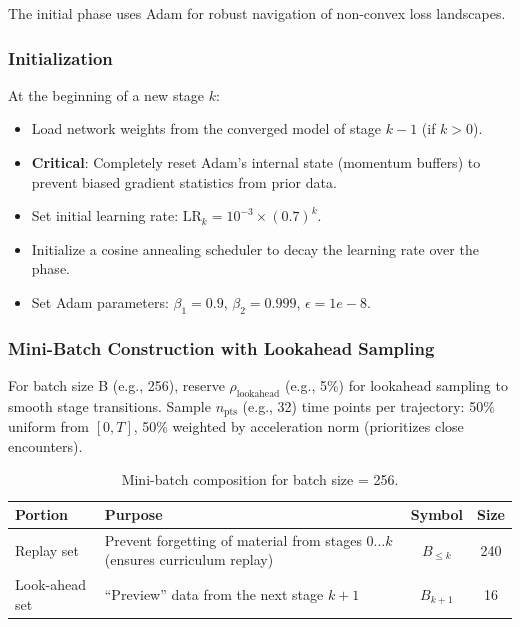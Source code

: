 The initial phase uses Adam for robust navigation of non-convex loss landscapes.

\subsubsection{Initialization}
At the beginning of a new stage $k$:
\begin{itemize}
    \item Load network weights from the converged model of stage $k-1$ (if $k > 0$).
    \item \textbf{Critical}: Completely reset Adam's internal state (momentum buffers) to prevent biased gradient statistics from prior data.
    \item Set initial learning rate: $\text{LR}_k = 10^{-3} \times (0.7)^k$.
    \item Initialize a cosine annealing scheduler to decay the learning rate over the phase.
    \item Set Adam parameters: $\beta_1 = 0.9$, $\beta_2 = 0.999$, $\epsilon=1e-8$.
\end{itemize}

\subsubsection{Mini-Batch Construction with Lookahead Sampling}

For batch size B (e.g., 256), reserve $\rho_{\text{lookahead}}$ (e.g., 5\%) for lookahead sampling to smooth stage transitions. 
Sample $n_{\text{pts}}$ (e.g., 32) time points per trajectory: 50\% uniform from $[0, T]$, 50\% weighted by acceleration norm 
(prioritizes close encounters).


\begin{table}[H]
    \centering
    \begin{tabular}{|p{2.5cm}|p{4.5cm}|c|c|}
    \hline
    \textbf{Portion} & \textbf{Purpose} & \textbf{Symbol} & \textbf{Size} \\
    \hline
    Replay set & Prevent forgetting of material from stages $0 \ldots k$ (ensures curriculum replay) & $B_{\leq k}$ & 240 \\
    Look-ahead set & ``Preview'' data from the next stage $k+1$ & $B_{k+1}$ & 16 \\
    \hline
    \end{tabular}
    \caption{Mini-batch composition for batch size = 256.}
\end{table}



